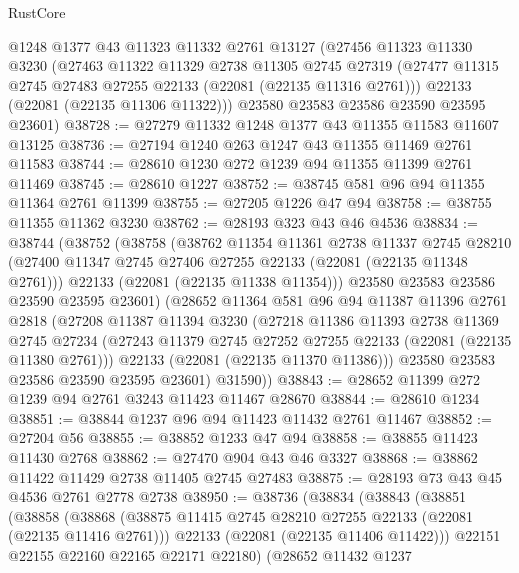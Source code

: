 \begin{lexlean}{RustCore}
\begin{coremodule}
    @1248
    @1377
    @43
    @11323
    @11332
    @2761
    @13127
    (@27456
      @11323
      @11330
      @3230
      (@27463
        @11322
        @11329
        @2738
        @11305
        @2745
        @27319
        (@27477 @11315 @2745 @27483 @27255 @22133 (@22081 (@22135 @11316 @2761)))
        @22133
        (@22081 (@22135 @11306 @11322)))
      @23580
      @23583
      @23586
      @23590
      @23595
      @23601)
@38728 := @27279 @11332 @1248 @1377 @43 @11355 @11583 @11607 @13125
@38736 := @27194 @1240 @263 @1247 @43 @11355 @11469 @2761 @11583
@38744 := @28610 @1230 @272 @1239 @94 @11355 @11399 @2761 @11469
@38745 := @28610 @1227
@38752 := @38745 @581 @96 @94 @11355 @11364 @2761 @11399
@38755 := @27205 @1226 @47 @94
@38758 := @38755 @11355 @11362 @3230
@38762 := @28193 @323 @43 @46 @4536
@38834 := @38744
    (@38752
      (@38758
        (@38762
          @11354
          @11361
          @2738
          @11337
          @2745
          @28210
          (@27400 @11347 @2745 @27406 @27255 @22133 (@22081 (@22135 @11348 @2761)))
          @22133
          (@22081 (@22135 @11338 @11354)))
        @23580
        @23583
        @23586
        @23590
        @23595
        @23601)
      (@28652
        @11364
        @581
        @96
        @94
        @11387
        @11396
        @2761
        @2818
        (@27208
          @11387
          @11394
          @3230
          (@27218
            @11386
            @11393
            @2738
            @11369
            @2745
            @27234
            (@27243 @11379 @2745 @27252 @27255 @22133 (@22081 (@22135 @11380 @2761)))
            @22133
            (@22081 (@22135 @11370 @11386)))
          @23580
          @23583
          @23586
          @23590
          @23595
          @23601)
        @31590))
@38843 := @28652 @11399 @272 @1239 @94 @2761 @3243 @11423 @11467 @28670
@38844 := @28610 @1234
@38851 := @38844 @1237 @96 @94 @11423 @11432 @2761 @11467
@38852 := @27204 @56
@38855 := @38852 @1233 @47 @94
@38858 := @38855 @11423 @11430 @2768
@38862 := @27470 @904 @43 @46 @3327
@38868 := @38862 @11422 @11429 @2738 @11405 @2745 @27483
@38875 := @28193 @73 @43 @45 @4536 @2761 @2778 @2738
@38950 := @38736
    (@38834
      (@38843
        (@38851
          (@38858
            (@38868
              (@38875 @11415 @2745 @28210 @27255 @22133 (@22081 (@22135 @11416 @2761)))
              @22133
              (@22081 (@22135 @11406 @11422)))
            @22151
            @22155
            @22160
            @22165
            @22171
            @22180)
          (@28652
            @11432
            @1237

\end{coremodule}
\end{lexlean}
